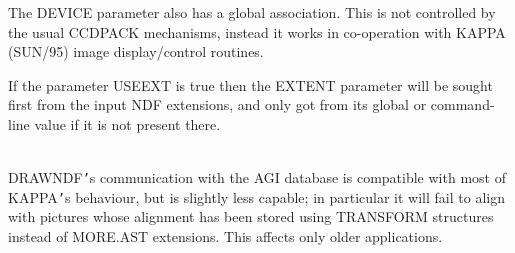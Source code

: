 \documentclass[twoside,11pt]{article}
\newcommand{\xref}[3]{#1}
\renewcommand{\_}{\texttt{\symbol{95}}}
\newcommand{\routine}[1]{{\sc #1}}
\newcommand{\sstimplementationstatus}[1]{
   \item[{Implementation Status:}] \mbox{} \\[1.3ex] #1}
\newcommand{\sstimplementationstatus}[1]{
      \item[Implementation Status:] #1
   }
\begin{document}
{{      The DEVICE parameter also has a global association. This is not
      controlled by the usual CCDPACK mechanisms, instead it works in
      co-operation with \xref{KAPPA}{sun95}{} (SUN/95) image display/control routines.

      If the parameter USEEXT is true then the EXTENT parameter will
      be sought first from the input NDF extensions, and only got
      from its global or command-line value if it is not present there.
   }
   \sstimplementationstatus{
      \routine{DRAWNDF}{\tt '}s communication with the AGI database is compatible with
      most of \xref{KAPPA}{sun95}{}{\tt '}s behaviour, but is slightly less capable; in
      particular it will fail to align with pictures whose alignment
      has been stored using TRANSFORM structures instead of MORE.AST
      extensions.  This affects only older applications.
   }
}
\end{document}
